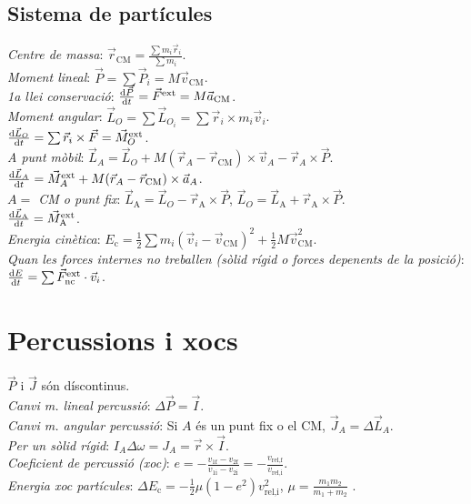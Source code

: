 \documentclass[10pt]{article}
\newcommand{\lp}{\left(}
\newcommand{\rp}{\right)}
\newcommand{\ci}{\textbullet\;}
\begin{document}
\begin{multicols}{4}
\subsection{Sistema de part\'icules}
\emph{Centre de massa}: $\vec{r}_{\text{CM}} = \frac{\sum m_i \vec{r}_i}{\sum m_i}$. \\
\emph{Moment lineal}: $\vec{P} = \sum \vec{P}_i = M\vec{v}_{\text{CM}}$. \\
\emph{1a llei conservaci\'o}: $\frac{\dif \vec{P}}{\dif t} = \vec{F}^{\text{ext}} = 
  M \vec{a}_\text{CM}$. \\
\emph{Moment angular}: $\vec{L}_O = \sum \vec{L}_{O_i} = \sum \vec{r}_i \times m_i\vec{v}_i$. \\
\ci $\frac{\dif \vec{L}_O}{\dif t} = \sum \vec{r}_i\times\vec{F} = \vec{M}_O^{\text{ext}}$. \\
\emph{A punt m\`obil}: $\vec{L}_A = \vec{L}_O + M(\vec{r}_A - \vec{r}_{\text{CM}}) \times \vec{v}_A - \vec{r}_A\times\vec{P}$. \\
\ci $\frac{\dif \vec{L}_A}{\dif t} = \vec{M}_A^{\text{ext}} + M(\vec{r}_A - \vec{r}_{\text{CM}})\times \vec{a}_A$. \\
\emph{$A =$ CM o punt fix}: $\vec{L}_{\text{A}} = \vec{L}_O - \vec{r}_{\text{A}}\times\vec{P}$, $\vec{L}_O = \vec{L}_{\text{A}} + \vec{r}_{\text{A}}\times\vec{P}$. \\
\ci $\frac{\dif \vec{L}_{\text{A}}}{\dif t} = \vec{M}_{\text{A}}^{\text{ext}}$. \\
\emph{Energia cinètica}: $E_{\text{c}} = \frac{1}{2} \sum m_i (\vec{v}_i - \vec{v}_{\text{CM}})^2 + \frac{1}{2}  M\vec{v}_{\text{CM}}^2$.\\
\emph{Quan les forces internes no treballen (sòlid rígid o forces depenents de la posició)}: $\frac{\dif E}{\dif t}  =\sum \vec{F}^{\text{ext}}_\text{nc}\cdot\vec{v}_i$. \\


\section{Percussions i xocs}
$\vec{P}$ i $\vec{J}$ són díscontinus.\\
\emph{Canvi m. lineal percussió}: $\Delta \vec{P} = \vec{I}$.\\
\emph{Canvi m. angular percussió}: Si $A$ és un punt fix o el CM, $\vec{J}_A = \Delta \vec{L}_A$.\\
\emph{Per un sòlid rígid}: $I_A \Delta \omega = J_A = \vec{r}\times \vec{I}$.\\
\emph{Coeficient de percussió (xoc)}: $e = - \frac{v_{1\text{f}} - v_{2\text{f}}}{v_{1\text{i}} - v_{2\text{i}}}=-\frac{v_{\text{rel,f}}}{v_{\text{rel,i}}}$.\\
\emph{Energia xoc partícules}: $\Delta E_\text{c} = -\frac{1}{2} \mu \lp 1 - e^2 \rp v_\text{rel,i}^2$, $\mu=\frac{m_1m_2}{m_1+m_2}$ .\\




\end{multicols}
\end{document}
